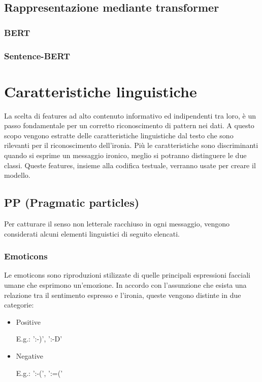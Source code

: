 \documentclass[oneside]{book}
\begin{document}
\subsection{Rappresentazione mediante transformer}


\subsubsection{BERT}

\subsubsection{Sentence-BERT}


\section{Caratteristiche linguistiche}
La scelta di features ad alto contenuto informativo ed indipendenti tra loro, è un passo fondamentale per un corretto riconoscimento di pattern nei dati.
A questo scopo vengono estratte delle caratteristiche linguistiche dal testo che sono rilevanti per il riconoscimento dell'ironia. Più le caratteristiche sono discriminanti quando si esprime un messaggio ironico, meglio si potranno distinguere le due classi. Queste features, insieme alla codifica testuale, verranno usate per creare il modello.

\subsection{PP (Pragmatic particles)}
Per catturare il senso non letterale racchiuso in ogni messaggio, vengono considerati alcuni elementi linguistici di seguito elencati.

\subsubsection{Emoticons}
Le emoticons sono riproduzioni stilizzate di quelle principali espressioni facciali umane che esprimono un'emozione. In accordo con l'assunzione che esista una relazione tra il sentimento espresso e l'ironia, queste vengono distinte in due categorie:
\begin{itemize}
	\item
	Positive
	
	E.g.: ':-)', ':-D'
	\item
	Negative
	
	E.g.: ':-(', ':=('
	
\end{itemize}
\end{document}
